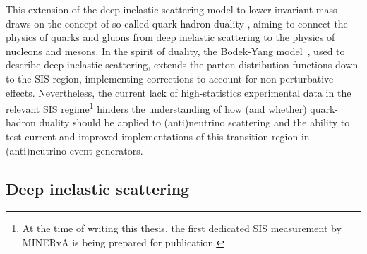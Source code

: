 
This extension of the deep inelastic scattering model to lower invariant mass draws on the concept of so-called quark-hadron duality \cite{athar2020neutrino}, aiming to connect the physics of quarks and gluons from deep inelastic scattering to the physics of nucleons and mesons. In the spirit of duality, the Bodek-Yang model~\cite{BodekYang_2003, BODEK2005113}, used to describe deep inelastic scattering, extends the parton distribution functions down to the SIS region, implementing corrections to account for non-perturbative effects. Nevertheless, the current lack of high-statistics experimental data in the relevant SIS regime\footnote{At the time of writing this thesis, the first dedicated SIS measurement by MINERvA is being prepared for publication.} hinders the understanding of how (and whether) quark-hadron duality should be applied to (anti)neutrino scattering and the ability to test current and improved implementations of this transition region in (anti)neutrino event generators.


\subsection{Deep inelastic scattering}\label{subsec:dis}

